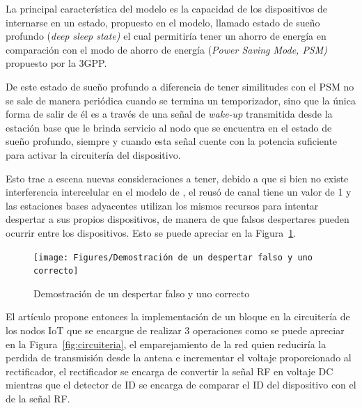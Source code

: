 La principal característica del modelo es la capacidad de los dispositivos de internarse en un estado, propuesto en el modelo, llamado estado de sueño profundo (\textit{deep sleep state) }el cual permitiría tener un ahorro de energía en comparación con el modo de ahorro de energía (\textit{Power Saving Mode, PSM) }propuesto por la 3GPP. \newline

De este estado de sueño profundo\textit{ }a diferencia de tener similitudes con el PSM no se sale de manera periódica cuando se termina un temporizador, sino que la única forma de salir de él es a través de una señal de \textit{wake-up} transmitida desde la estación base que le brinda servicio al nodo que se encuentra en el estado de sueño profundo, siempre y cuando esta señal cuente con la potencia suficiente para activar la circuitería del dispositivo. \newline

Esto trae a escena nuevas consideraciones a tener, debido a que si bien no existe interferencia intercelular en el modelo de \parencite{Kouzayha2018}, el reusó de canal tiene un valor de 1 y las estaciones bases adyacentes utilizan los mismos recursos para intentar despertar a sus propios dispositivos, de manera de que falsos despertares pueden ocurrir entre los dispositivos. Esto se puede apreciar en la Figura~\ref{fig:despertar}.\newline

\begin{figure}[th]
\centering
\texttt{[image: Figures/Demostración de un despertar falso y uno correcto]}
\decoRule
\caption[Demostración de un despertar falso y uno correcto]{Demostración de un despertar falso y uno correcto}
\label{fig:despertar}
\end{figure}

El artículo propone entonces la implementación de un bloque en la circuitería de los nodos IoT que se encargue de realizar 3 operaciones como se puede apreciar en la Figura~\ref{fig:circuiteria}, el emparejamiento de la red quien reduciría la perdida de transmisión desde la antena e incrementar el voltaje proporcionado al rectificador, el rectificador se encarga de convertir la señal RF en voltaje DC mientras que el detector de ID se encarga de comparar el ID del dispositivo con el de la señal RF.\newline


